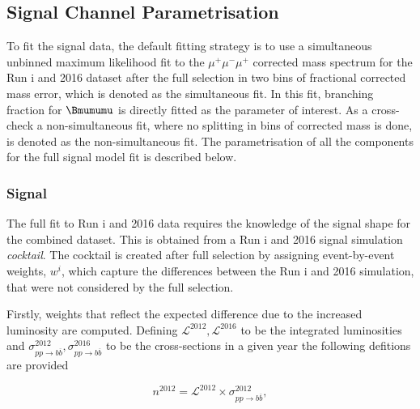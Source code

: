 \subsection{Signal Channel Parametrisation}
\label{sigpara}
To fit the signal data, the default fitting strategy is to use a simultaneous unbinned maximum likelihood fit to the $\mu^{+} \mu^{-} \mu^{+}$ corrected mass spectrum for the  Run \Rn{1} and 2016 dataset after the full selection in two bins of fractional corrected mass error, which is denoted as the simultaneous fit. In this fit, branching fraction for $\Bmumumu$  is directly fitted as the parameter of interest. As a cross-check a non-simultaneous fit, where no splitting in bins of corrected mass is done, is denoted as the non-simultaneous fit. The parametrisation of all the components for the full signal model fit is described below.


\subsubsection{Signal}
The full fit to Run \Rn{1} and 2016 data requires the knowledge of the signal shape for the combined dataset. This is obtained from a Run \Rn{1} and 2016 signal simulation \textit{cocktail}. The cocktail is created after full selection by assigning event-by-event weights, \textit{$w^{i}$}, which capture the differences between the Run \Rn{1} and 2016 simulation, that were not considered by the full selection.

Firstly, weights that reflect the expected difference due to the increased luminosity are computed. Defining $\mathcal{L}^{2012},\mathcal{L}^{2016}$ to be the integrated luminosities and $\sigma^{2012}_{pp \rightarrow b \overline{b}}, \sigma^{2016}_{pp \rightarrow b \overline{b}}$ to be the cross-sections in a given year the following defitions are provided

\begin{equation}
n^{2012}=\mathcal{L}^{2012} \times \sigma^{2012}_{pp \rightarrow b \overline{b}},
\end{equation}

